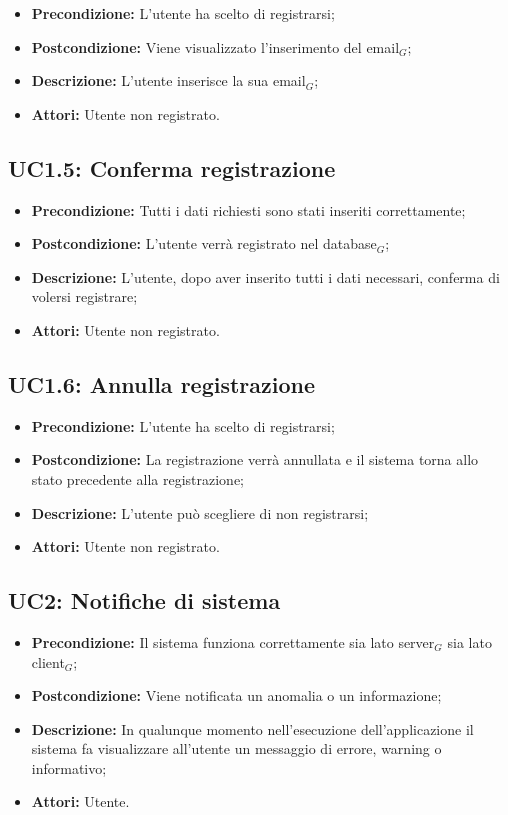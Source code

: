 \begin{itemize}
	\item \textbf{Precondizione:} L'utente ha scelto di registrarsi;
	\item \textbf{Postcondizione:} Viene visualizzato l'inserimento del email$_G$;
	\item \textbf{Descrizione:} L'utente inserisce la sua email$_G$;
	\item \textbf{Attori:} Utente non registrato.
\end{itemize}
\subsection{ UC1.5: Conferma registrazione}

\begin{itemize}
	\item \textbf{Precondizione:} Tutti i dati richiesti sono stati inseriti correttamente;
	\item \textbf{Postcondizione:} L'utente verrà registrato nel database$_G$;
	\item \textbf{Descrizione:} L'utente, dopo aver inserito tutti i dati necessari, conferma di volersi registrare;
	\item \textbf{Attori:} Utente non registrato.
\end{itemize}
\subsection{ UC1.6: Annulla registrazione}

\begin{itemize}
	\item \textbf{Precondizione:} L'utente ha scelto di registrarsi;
	\item \textbf{Postcondizione:} La registrazione verrà annullata e il sistema torna allo stato precedente alla registrazione;
	\item \textbf{Descrizione:} L'utente può scegliere di non registrarsi;
	\item \textbf{Attori:} Utente non registrato.
\end{itemize}
\subsection{ UC2: Notifiche di sistema}

\begin{itemize}
	\item \textbf{Precondizione:} Il sistema funziona correttamente sia lato server$_G$ sia lato client$_G$;
	\item \textbf{Postcondizione:} Viene notificata un anomalia o un informazione;
	\item \textbf{Descrizione:} In qualunque momento nell'esecuzione dell'applicazione il sistema fa visualizzare all'utente un messaggio di errore, warning o informativo;
	\item \textbf{Attori:} Utente.
\end{itemize}
